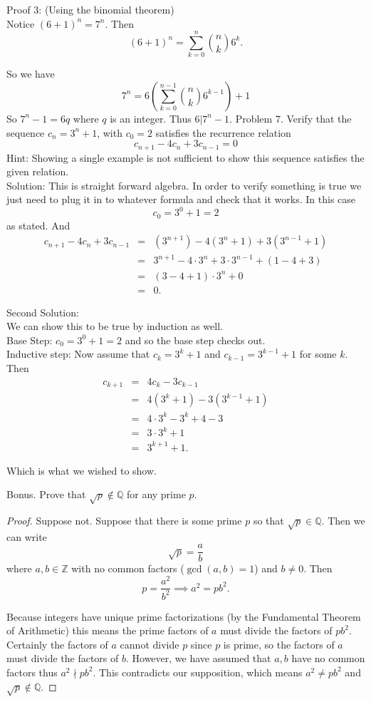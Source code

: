\documentclass[16 pt]{amsart}
\theoremstyle{definition}
\theoremstyle{remark}
\numberwithin{equation}{subsection}
\newcommand{\Z}{\mathbb{Z}}
\newcommand{\Q}{\mathbb{Q}}
\begin{document}
\newpage
Proof 3: (Using the binomial theorem)\\

Notice $(6+1)^n = 7^n$. Then
\[
(6+1)^n = \sum_{k=0}^{n}{n\choose k}6^k.
\]

So we have 
\[
7^n = 6(\sum_{k=0}^{n-1}{n\choose k}6^{k-1})+1
\]
So $7^n-1 = 6q$ where $q$ is an integer.  Thus $6|7^n-1$.
\newpage
Problem 7.
Verify that the sequence $c_n = 3^n +1$, with $c_0=2$ satisfies the recurrence relation
\[
c_{n+1} - 4 c_n + 3c_{n-1}=0
\]
Hint: Showing a single example is not sufficient to show this sequence satisfies the given relation.\\

Solution:  This is straight forward algebra.  In order to verify something is true we just need to plug it in to whatever formula and check that it works.  In this case
\[
c_0 = 3^0+1 =2
\]
as stated.  And
\begin{eqnarray*}
c_{n+1}-4c_n+3c_{n-1} &=& (3^{n+1}) - 4(3^n+1)+3(3^{n-1}+1)\\
&=& 3^{n+1} -4\cdot 3^n + 3\cdot 3^{n-1} + (1-4+3)\\
&=& (3-4+1)\cdot 3^n +0\\
&=& 0.
\end{eqnarray*}
\vspace{1in}

Second Solution:\\
We can show this to be true by induction as well.\\
Base Step: $c_0 = 3^0+1=2$ and so the base step checks out.\\
Inductive step:  Now assume that $c_k=3^k+1$ and $c_{k-1}=3^{k-1}+1$ for some $k$.  Then
\begin{eqnarray*}
c_{k+1} &=& 4c_k - 3c_{k-1}\\
&=& 4(3^k+1) - 3(3^{k-1}+1)\\
&=& 4\cdot 3^k - 3^k +4-3\\
&=& 3\cdot 3^k+1\\
&=& 3^{k+1}+1.
\end{eqnarray*}

Which is what we wished to show.

\newpage
Bonus.
Prove that $\sqrt{p} \notin \Q$ for any prime $p$.
\begin{proof}
Suppose not.  Suppose that there is some prime $p$ so that $\sqrt{p}\in\Q$.  Then we can write 
\[
\sqrt{p}=\frac{a}{b}
\]
where $a,b\in\Z$ with no common factors ($\gcd(a,b)=1$) and $b\neq 0$. Then
\[
p = \frac{a^2}{b^2} \implies a^2 = pb^2.
\]

Because integers have unique prime factorizations (by the Fundamental Theorem of Arithmetic) this means the prime factors of $a$ must divide the factors of $pb^2$.  Certainly the factors of $a$ cannot divide $p$ since $p$ is prime, so the factors of $a$ must divide the factors of $b$.  However, we have assumed that $a,b$ have no common factors thus $a^2 \nmid pb^2$.  This contradicts our supposition, which means $a^2 \neq pb^2$ and $\sqrt{p}\notin \Q$.


\end{proof}
\end{document}

